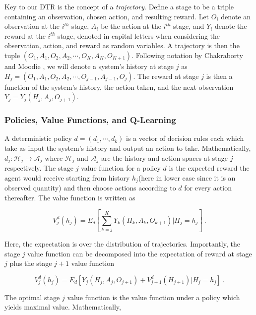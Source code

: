 Key to our DTR is the concept of a \textit{trajectory}. Define a stage to be a triple containing an observation, chosen action, and resulting reward. Let $O_i$ denote an observation at the $i^{th}$ stage, $ A_i $ be the action at the $ i^{th} $ stage, and $ Y_i $ denote the reward at the $ i^{th}$ stage, denoted in capital letters when considering the observation, action, and reward as random variables.  A  trajectory is then the tuple $ (O_1, A_1, O_2, A_2,  \cdots, O_K, A_K, O_{K+1})$.  Following notation by Chakraborty and Moodie \cite{chakraborty2013statistical}, we will denote a system’s history at stage $ j $ as $ H_j = (O_1, A_1, O_2, A_2, \cdots , O_{j-1}, A_{j-1}, O_j) $.  The reward at stage $j$ is then a function of the system’s history, the action taken, and the next observation $ Y_j = Y_j(H_j, A_j, O_{j+1}) $.

\subsubsection{Policies, Value Functions, and Q-Learning}

A deterministic policy $ d = (d_1, \cdots, d_k) $ is a vector of decision rules each which take as input the system’s history and output an action to take.  Mathematically, $d_j : \mathcal{H}_j \to \mathcal{A}_j$ where $\mathcal{H}_j$ and $\mathcal{A}_j$ are the history and action spaces at stage $j$ respectively.  The stage $ j $ value function for a policy $ d $ is the expected reward the agent would receive starting from history $ h_j  $(here in lower case since it is an observed quantity) and then choose actions according to $ d $ for every action thereafter.  The value function is written as

\begin{equation}
	V^d_j(h_j) = E_d\left[ \sum_{k=j}^K Y_k(H_k, A_k, O_{k+1}) \Bigg\lvert H_j = h_j\right] \>.
\end{equation}

\noindent Here, the expectation is over the distribution of trajectories. Importantly, the stage $ j $ 
value function can be decomposed into the expectation of reward at stage $ j $ plus the stage $ j+1  $ value function  \cite{chakraborty2013statistical}

\begin{equation}
V^d_j(h_j) = E_d\left[Y_j(H_j, A_j, O_{j+1}) + V^d_{j+1}(H_{j+1}) \vert H_j = h_j\right] \>.
\end{equation}


\noindent The optimal stage $ j  $ value function is the value function under a policy which yields maximal value.  Mathematically, 

